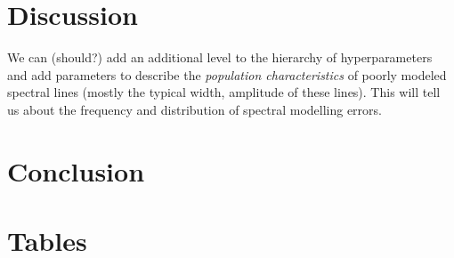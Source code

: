\documentclass[iop,floatfix]{emulateapj}
\begin{document}
\section{Discussion}
\label{sec:discussion}

We can (should?) add an additional level to the hierarchy of
  hyperparameters and add parameters to describe the \emph{population
  characteristics} of poorly modeled spectral lines (mostly the typical width,
  amplitude of these lines).  This will tell us about the frequency and
distribution of spectral modelling errors.

\section{Conclusion}
\label{sec:conclusion}




\section{Tables}
\end{document}

